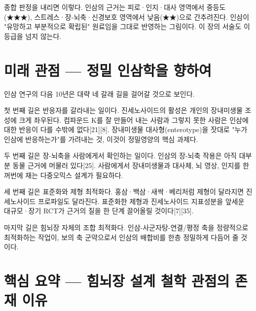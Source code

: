 \documentclass[12pt,oneside]{book}
\begin{document}
종합 판정을 내리면 이렇다. 인삼의 근거는 피로·인지·대사 영역에서 중등도(★★★), 스트레스·장-뇌축·신경보호 영역에서 낮음(★★)으로 간추려진다. 인삼이 "유망하고 부분적으로 확립된" 원료임을 그대로 반영하는 그림이다. 이 장의 서술도 이 등급을 넘지 않는다.

\section{미래 관점 — 정밀 인삼학을 향하여}

인삼 연구의 다음 10년은 대략 네 갈래 길을 걸어갈 것으로 보인다.

첫 번째 길은 반응자를 갈라내는 일이다. 진세노사이드의 활성은 개인의 장내미생물 조성에 크게 좌우된다. 컴파운드 K를 잘 만들어 내는 사람과 그렇지 못한 사람은 인삼에 대한 반응이 다를 수밖에 없다[21][8]. 장내미생물 대사형(enterotype)을 잣대로 "누가 인삼에 반응하는가"를 가려내는 것, 이것이 정밀영양의 핵심 과제다.

두 번째 길은 장-뇌축을 사람에게서 확인하는 일이다. 인삼의 장-뇌축 작용은 아직 대부분 동물 근거에 머물러 있다[25]. 사람에게서 장내미생물과 대사체, 뇌 영상, 인지를 한꺼번에 재는 다중오믹스 설계가 필요하다.

세 번째 길은 표준화와 제형 최적화다. 홍삼·백삼·새싹·베리처럼 제형이 달라지면 진세노사이드 프로파일도 달라진다. 표준화한 제형과 진세노사이드 지표성분을 앞세운 대규모·장기 RCT가 근거의 질을 한 단계 끌어올릴 것이다[7][35].

마지막 길은 힘뇌장 자체의 조합 최적화다. 인삼-사군자탕-연결/평정 축을 정량적으로 최적화하는 작업이, 보의 축 군약으로서 인삼의 배합비를 한층 정밀하게 다듬어 줄 것이다.

\section{핵심 요약 — 힘뇌장 설계 철학 관점의 존재 이유}
\end{document}
